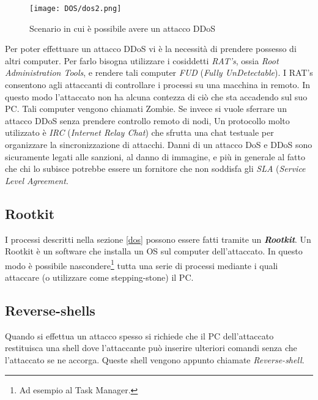 \documentclass[14pt]{extreport}
\begin{document}
\begin{figure}[H]
    \centering
    \texttt{[image: DOS/dos2.png]}
    \caption{Scenario in cui è possibile avere un attacco DDoS}
\end{figure}




Per poter effettuare un attacco DDoS vi è la necessità di prendere possesso di altri computer. Per farlo bisogna utilizzare i cosiddetti \textit{RAT's}, ossia \textit{Root Administration Tools}, e rendere tali computer \textit{FUD} (\textit{Fully UnDetectable}). I RAT's consentono agli attaccanti di controllare i processi su una macchina in remoto. In questo modo l'attaccato non ha alcuna contezza di ciò che sta accadendo sul suo PC. Tali computer vengono chiamati Zombie.\newline
Se invece si vuole sferrare un attacco DDoS senza prendere controllo remoto di nodi, Un protocollo molto utilizzato è \textit{IRC} (\textit{Internet Relay Chat}) che sfrutta una chat testuale per organizzare la sincronizzazione di attacchi.
Danni di un attacco DoS e DDoS sono sicuramente legati alle sanzioni, al danno di immagine, e più in generale al fatto che chi lo subisce potrebbe essere un fornitore che non soddisfa gli \textit{SLA} (\textit{Service Level Agreement}.


\subsection{Rootkit}
I processi descritti nella sezione \ref{dos} possono essere fatti tramite un \textit{\textbf{Rootkit}}. Un Rootkit è un software che installa un OS sul computer dell'attaccato. In questo modo è possibile nascondere\footnote{Ad esempio al Task Manager.} tutta una serie di processi mediante i quali attaccare (o utilizzare come stepping-stone) il PC.

\subsection{Reverse-shells}
Quando si effettua un attacco spesso si richiede che il PC dell'attaccato restituisca una shell dove l'attaccante può inserire ulteriori comandi senza che l'attaccato se ne accorga. Queste shell vengono appunto chiamate \textit{\textit{Reverse-shell}}.
\end{document}
